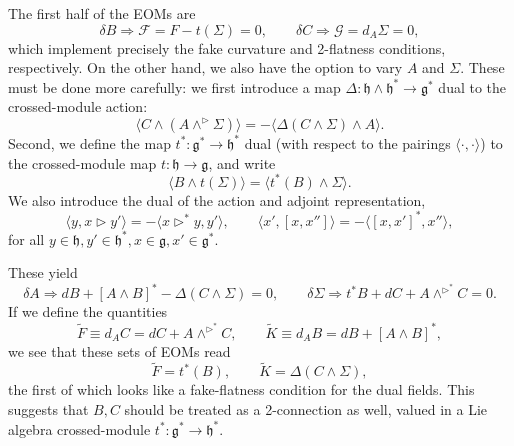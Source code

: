 \documentclass[onecolumn]{article}
\theoremstyle{theorem}
\theoremstyle{remark}
\theoremstyle{example}
\theoremstyle{definition}
\numberwithin{equation}{section}
\def\g{\mathfrak g}
\def\h{\mathfrak h}
\begin{document}
The first half of the EOMs are
\begin{equation}
    \delta B \Rightarrow \mathcal{F}=F - t(\Sigma)=0,\qquad \delta C\Rightarrow \mathcal{G}=d_A\Sigma=0,\nonumber
\end{equation}
which implement precisely the fake curvature and 2-flatness conditions, respectively. On the other hand, we also have the option to vary $A$ and $\Sigma$.  These must be done more carefully: we first introduce a map $\Delta: \mathfrak{h}\wedge\h^*\rightarrow \mathfrak{g}^*$ dual to the crossed-module action:
\begin{equation}
    \langle C\wedge (A\wedge^\rhd \Sigma)\rangle = -\langle \Delta(C\wedge \Sigma)\wedge A\rangle.\nonumber
\end{equation}
{Second,} we define the map $t^*:\mathfrak{g}^*\rightarrow\mathfrak{h}^*$ dual (with respect to the pairings $\langle\cdot,\cdot\rangle$) to the crossed-module map $t:\mathfrak{h}\rightarrow\mathfrak{g}$, and write
\begin{equation}
    \langle B\wedge t(\Sigma)\rangle = \langle t^*(B)\wedge \Sigma\rangle.\nonumber
\end{equation}
{We} also introduce the dual of the action and adjoint representation, 
\begin{equation}
    \langle y,x\rhd y'\rangle= -\langle x\rhd^* y,y'\rangle,\qquad\langle x',[x,x'']\rangle = -\langle [x,x']^*,x''\rangle,\nonumber 
\end{equation}
for all $y\in\h,y'\in\mathfrak{h}^*,x\in\mathfrak{g},x'\in \g^*$.

These yield
\begin{equation}
    \delta A \Rightarrow dB+[A\wedge B]^* - \Delta(C\wedge\Sigma)=0,\qquad \delta \Sigma \Rightarrow t^*B + dC + A\wedge^{\rhd^*} C=0.\nonumber 
\end{equation}
{If} we define the quantities
\begin{equation}
    \tilde F \equiv d_AC = dC+A\wedge^{\rhd^*} C,\qquad \tilde K\equiv d_AB = dB+[A\wedge B]^*,\nonumber
\end{equation}
we see that these sets of EOMs read
\begin{equation}
    \tilde F = t^*(B),\qquad \tilde K = \Delta(C\wedge \Sigma), \label{eq:dual}
\end{equation}
the first of which looks like a fake-flatness condition for the dual fields. This suggests that $B,C$ should be treated as a 2-connection as well, valued in a Lie algebra crossed-module $t^*:\mathfrak{g}^*\rightarrow\mathfrak{h}^*$.
\end{document}
